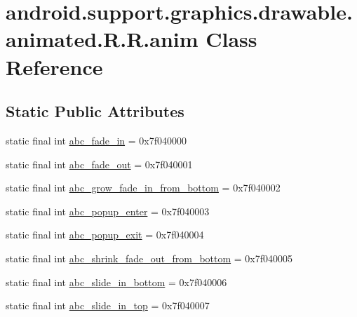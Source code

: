 \hypertarget{classandroid_1_1support_1_1graphics_1_1drawable_1_1animated_1_1_r_1_1anim}{
\section{android.support.graphics.drawable.animated.R.R.anim Class Reference}
\label{classandroid_1_1support_1_1graphics_1_1drawable_1_1animated_1_1_r_1_1anim}
}
\subsection*{Static Public Attributes}
\begin{CompactItemize}
\item 
static final int \hyperlink{classandroid_1_1support_1_1graphics_1_1drawable_1_1animated_1_1_r_1_1anim_5c96d3f03b7aebefd902fee61aadac8c}{abc\_\-fade\_\-in} = 0x7f040000
\item 
static final int \hyperlink{classandroid_1_1support_1_1graphics_1_1drawable_1_1animated_1_1_r_1_1anim_2d2ab0e2dc78bbb62142506d5b5e6693}{abc\_\-fade\_\-out} = 0x7f040001
\item 
static final int \hyperlink{classandroid_1_1support_1_1graphics_1_1drawable_1_1animated_1_1_r_1_1anim_e6982f19c133d75bd9fdd27c3a158b12}{abc\_\-grow\_\-fade\_\-in\_\-from\_\-bottom} = 0x7f040002
\item 
static final int \hyperlink{classandroid_1_1support_1_1graphics_1_1drawable_1_1animated_1_1_r_1_1anim_a76bc67c01324c848c9adc03d22491d7}{abc\_\-popup\_\-enter} = 0x7f040003
\item 
static final int \hyperlink{classandroid_1_1support_1_1graphics_1_1drawable_1_1animated_1_1_r_1_1anim_371b462db0691a1c5eb9711dc1e4d648}{abc\_\-popup\_\-exit} = 0x7f040004
\item 
static final int \hyperlink{classandroid_1_1support_1_1graphics_1_1drawable_1_1animated_1_1_r_1_1anim_c1aacc2e94e259f178b3a99c6965425a}{abc\_\-shrink\_\-fade\_\-out\_\-from\_\-bottom} = 0x7f040005
\item 
static final int \hyperlink{classandroid_1_1support_1_1graphics_1_1drawable_1_1animated_1_1_r_1_1anim_b6a55902144275b8db52328a474fda18}{abc\_\-slide\_\-in\_\-bottom} = 0x7f040006
\item 
static final int \hyperlink{classandroid_1_1support_1_1graphics_1_1drawable_1_1animated_1_1_r_1_1anim_8505ce5ff25adcd60f6247114d0bb6f9}{abc\_\-slide\_\-in\_\-top} = 0x7f040007
\item 

\end{CompactItemize}

